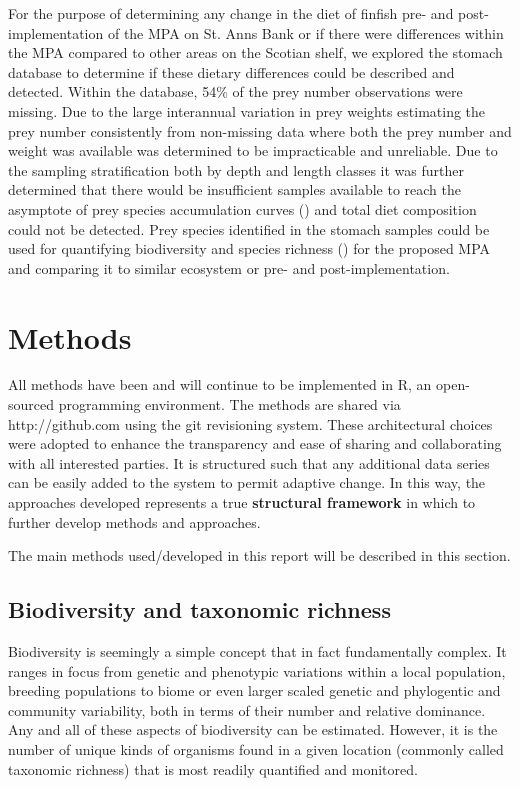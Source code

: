 \documentclass[letterpaper,portrait,11pt]{scrartcl}
\numberwithin{equation}{section}		%
\numberwithin{figure}{section}		%
\numberwithin{table}{section}				%
\begin{document}
For the purpose of determining any change in the diet of finfish pre- and post- implementation of the MPA on St. Anns Bank or if there were differences within the MPA compared to other areas on the Scotian shelf, we explored the stomach database to determine if these dietary differences could be described and detected. Within the database, 54\% of the prey number observations were missing.  Due to the large interannual variation in prey weights estimating the prey number consistently from non-missing data where both the prey number and weight was available was determined to be impracticable and unreliable.  Due to the sampling stratification both by depth and length classes it was further determined that there would be insufficient samples available to reach the asymptote of prey species accumulation curves (\cite{cook2010food}) and total diet composition could not be detected.  Prey species identified in the stomach samples could be used for quantifying biodiversity and species richness (\cite{cook2012food}) for the proposed MPA and comparing it to similar ecosystem or pre- and post-implementation.


\clearpage
\section{Methods}

All methods have been and will continue to be implemented in R, an open-sourced programming environment. The methods are shared via http://github.com using the git revisioning system. These architectural choices were adopted to enhance the transparency and ease of sharing and collaborating with all interested parties. It is structured such that any additional data series can be easily added to the system to permit adaptive change. In this way, the approaches developed represents a true \textbf{structural framework} in which to further develop methods and approaches. 

The main methods used/developed in this report will be described in this section.


\subsection{Biodiversity and taxonomic richness}


Biodiversity is seemingly a simple concept that in fact fundamentally complex. It ranges in focus from genetic and phenotypic variations within a local population, breeding populations to biome or even larger scaled genetic and phylogentic and community variability, both in terms of their number and relative dominance. Any and all of these aspects of biodiversity can be estimated. However, it is the number of unique kinds of organisms found in a given location (commonly called taxonomic richness) that is most readily quantified and monitored. 
\end{document}
